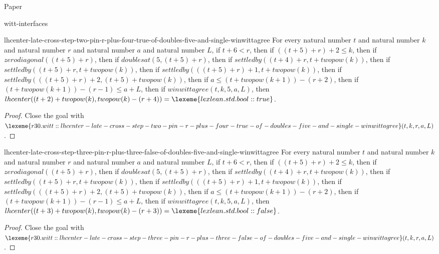 \begin{lexlean}{Paper}
\begin{section}{witt-interfaces}
  \begin{theorem}{lhcenter-late-cross-step-two-pin-r-plus-four-true-of-doubles-five-and-single-winwittagree}
  For every natural number \(t\) and natural number \(k\) and natural number \(r\) and natural number \(a\) and natural number \(L\), if \(t + 6 < r\), then if \(((t + 5) + r) + 2 ≤ k\), then if \(zerodiagonal((t + 5) + r)\), then if \(doublesat(5, (t + 5) + r)\), then if \(settledby((t + 4) + r, t + twopow(k))\), then if \(settledby((t + 5) + r, t + twopow(k))\), then if \(settledby(((t + 5) + r) + 1, t + twopow(k))\), then if \(settledby(((t + 5) + r) + 2, (t + 5) + twopow(k))\), then if \(a ≤ (t + twopow(k + 1)) - (r + 2)\), then if \((t + twopow(k + 1)) - (r - 1) ≤ a + L\), then if \(winwittagree(t, k, 5, a, L)\), then \(lhcenter((t + 2) + twopow(k), twopow(k) - (r + 4)) = \lexeme{lexlean.std.bool::true}\).
  \begin{proof}
  Close the goal with \(\lexeme{r30.witt::lhcenter-late-cross-step-two-pin-r-plus-four-true-of-doubles-five-and-single-winwittagree}(t, k, r, a, L)\).
  \end{proof}
  \end{theorem}

  \begin{theorem}{lhcenter-late-cross-step-three-pin-r-plus-three-false-of-doubles-five-and-single-winwittagree}
  For every natural number \(t\) and natural number \(k\) and natural number \(r\) and natural number \(a\) and natural number \(L\), if \(t + 6 < r\), then if \(((t + 5) + r) + 2 ≤ k\), then if \(zerodiagonal((t + 5) + r)\), then if \(doublesat(5, (t + 5) + r)\), then if \(settledby((t + 4) + r, t + twopow(k))\), then if \(settledby((t + 5) + r, t + twopow(k))\), then if \(settledby(((t + 5) + r) + 1, t + twopow(k))\), then if \(settledby(((t + 5) + r) + 2, (t + 5) + twopow(k))\), then if \(a ≤ (t + twopow(k + 1)) - (r + 2)\), then if \((t + twopow(k + 1)) - (r - 1) ≤ a + L\), then if \(winwittagree(t, k, 5, a, L)\), then \(lhcenter((t + 3) + twopow(k), twopow(k) - (r + 3)) = \lexeme{lexlean.std.bool::false}\).
  \begin{proof}
  Close the goal with \(\lexeme{r30.witt::lhcenter-late-cross-step-three-pin-r-plus-three-false-of-doubles-five-and-single-winwittagree}(t, k, r, a, L)\).
  \end{proof}
  \end{theorem}


\end{section}
\end{lexlean}
